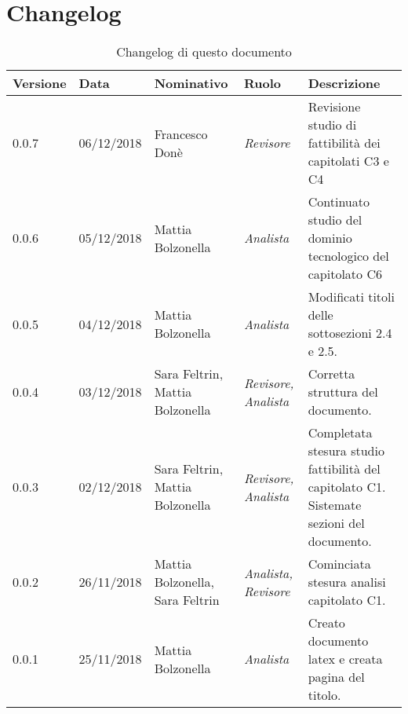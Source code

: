 \section{Changelog}
\begin{table}[tbph]
        \centering
        \begin{tabularx}{\textwidth}{|l|l|l|l|X|}
                \hline
                \textbf{Versione} & \textbf{Data} & \textbf{Nominativo}  & \textbf{Ruolo} & 
                \textbf{Descrizione}\\
                \hline \hline
              	0.0.7 & 06/12/2018 & Francesco Donè & \textit{Revisore} & 
              	Revisione studio di fattibilità dei capitolati C3 e C4\\
              	0.0.6 & 05/12/2018 & Mattia Bolzonella & \textit{Analista} & 
              	Continuato studio del dominio tecnologico del capitolato C6\\
              	\hline
              	0.0.5 & 04/12/2018 & Mattia Bolzonella & \textit{Analista} & 
              	Modificati titoli delle sottosezioni 2.4 e 2.5. \\
              	\hline
              	0.0.4 & 03/12/2018 & Sara Feltrin, Mattia Bolzonella 
              	& \textit{Revisore, Analista} & Corretta struttura del documento. \\
              	\hline
              	0.0.3 & 02/12/2018 & Sara Feltrin, Mattia Bolzonella & \textit{Revisore, Analista}
              	& Completata stesura studio fattibilità del capitolato C1.
              	Sistemate sezioni del documento. \\
              	\hline
              	0.0.2 & 26/11/2018 & Mattia Bolzonella, Sara Feltrin & \textit{Analista, Revisore}
              	& Cominciata stesura analisi capitolato C1.\\
                \hline
                0.0.1 & 25/11/2018 & Mattia Bolzonella & \textit{Analista}
                & Creato documento latex e creata pagina del titolo.\\
                \hline
              	
        \end{tabularx}
        \caption{Changelog di questo documento}
\end{table}